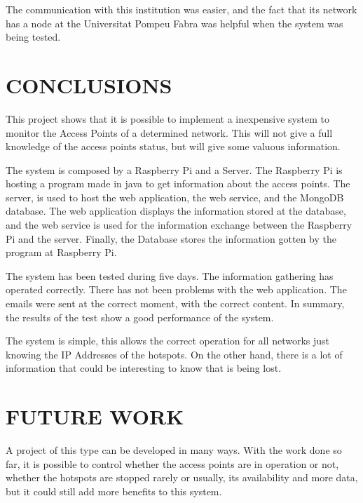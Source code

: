 \documentclass[12pt, a4paper,twoside]{tesi_upf}
\begin{document}
    The communication with this institution was easier, and the fact that its network has a node at the Universitat Pompeu Fabra was helpful when the system was being tested. 
    
    
\chapter{CONCLUSIONS}
\label{Chapter6}

This project shows that it is possible to implement a inexpensive system to monitor the Access Points of a determined network. This will not give a full knowledge of the access points status, but will give some valuous information.

The system is composed by a Raspberry Pi and a Server. The Raspberry Pi is hosting a program made in java to get information about the access points. The server, is used to host the web application, the web service, and the MongoDB database. The web application displays the information stored at the database, and the web service is used for the information exchange between the Raspberry Pi and the server. Finally, the Database stores the information gotten by the program at Raspberry Pi.

The system has been tested during five days. The information gathering has operated correctly. There has not been problems with the web application. The emails were sent at the correct moment, with the correct content. In summary, the results of the test show a good performance of the system.

The system is simple, this allows the correct operation for all networks just knowing the IP Addresses of the hotspots. On the other hand, there is a lot of information that could be interesting to know that is being lost.






\chapter{FUTURE WORK}
\label{Chapter7}

A project of this type can be developed in many ways. With the work done so far, it is possible to control whether the access points are in operation or not, whether the hotspots are stopped rarely or usually, its availability and more data, but it could still add more benefits to this system.
\end{document}
